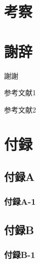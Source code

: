 \documentclass[11pt,a4j]{jreport}
\begin{document}
  \newpage




  \chapter{考察}

  \newpage




  \chapter*{謝辞} %
  謝謝

  \newpage


  
  
  \renewcommand{\bibname}{参考文献} %
  \begin{thebibliography}{99}
      参考文献1

      参考文献2
  \end{thebibliography}


  
  
  \chapter*{付録} %
    \appendix
    \setcounter{section}{0} %
    \renewcommand{\thesection}{\Alph{section}}
    \section{付録A}
      \subsection{付録A-1}

    \section{付録B}
      \subsection{付録B-1}
\end{document}
